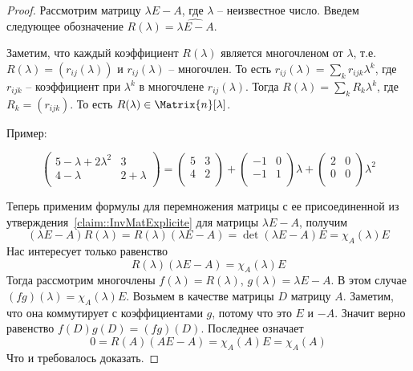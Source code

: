 \begin{proof}
    Рассмотрим матрицу $\lambda E - A$, где $\lambda$ -- неизвестное число.
    Введем следующее обозначение $R(\lambda) = \widehat{\lambda E - A}$.
    
    Заметим, что каждый коэффициент $R(\lambda)$ является многочленом от $\lambda$, т.е. $R(\lambda) = (r_{ij}(\lambda))$ и $r_{ij}(\lambda)$ -- многочлен.
    То есть $r_{ij}(\lambda) = \sum_k r_{ijk}\lambda^k$, где $r_{ijk}$ -- коэффициент при $\lambda^k$ в многочлене $r_{ij}(\lambda)$.
    Тогда $R(\lambda) = \sum_k R_k \lambda^k$, где $R_k=(r_{ijk})$.
    То есть $R(\lambda)\in\Matrix{n}[\lambda]$.
    
    Пример:
    
    \[
        \begin{pmatrix}
            {5-\lambda + 2 \lambda^2}&{3}\\
            {4 - \lambda}&{2+\lambda }\\
            \end{pmatrix} = 
            \begin{pmatrix}
                {5}&{3}\\
                {4}&{2}\\
                \end{pmatrix} 
            +
            \begin{pmatrix}
                {-1}&{0}\\
                {-1}&{1 }\\
                \end{pmatrix}  \lambda
            + 
            \begin{pmatrix}
                {2}&{0}\\
                {0}&{0}\\
                \end{pmatrix}  \lambda^2
    \]
    
Теперь применим формулы для перемножения матрицы с ее присоединенной из утверждения~\ref{claim::InvMatExplicite} для матрицы $\lambda E - A$, получим 
\[
(\lambda E - A)R(\lambda) = R(\lambda)(\lambda E - A) = \det(\lambda E - A)E=\chi_A(\lambda)E
\]
Нас интересует только равенство
\[
R(\lambda)(\lambda E - A) = \chi_A(\lambda)E
\]
Тогда рассмотрим многочлены $f(\lambda) = R(\lambda)$, $g(\lambda) = \lambda E  - A$.
В этом случае $(fg)(\lambda) = \chi_A(\lambda)E$.
Возьмем в качестве матрицы $D$ матрицу $A$.
Заметим, что она коммутирует с коэффициентами $g$, потому что это $E$ и $-A$.
Значит верно равенство $f(D)g(D) = (fg)(D)$.
Последнее означает
\[
0 = R(A)(A E - A) = \chi_A(A) E = \chi_A(A)
\]
Что и требовалось доказать.
\end{proof}


